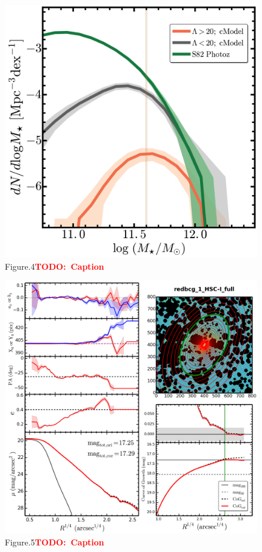 \documentclass[preprint]{aastex}
\newcommand{\todo}[1]{\textcolor{red}{\textbf{TODO:~#1}}}
\begin{document}
\begin{CJK*}{UTF8}{gbsn}
\clearpage
{}
\begin{figure}
    \centering 
    \includegraphics[width=14.5cm]{fig/dr1_redbcg_isedfit_mass_fsps1_sbpsum_imgsub_use_logm_distribution_s82}
    \caption{Figure.4\todo{Caption}}\label{figure:4}
\end{figure}

\clearpage
{}
\begin{figure}
    \centering 
    \includegraphics[width=15.5cm]{fig/redbcg_1_HSC-I_full_imgsub_ellip_default_sum.png}
    \caption{Figure.5\todo{Caption}}\label{figure:5}
\end{figure}


\end{CJK*}
\end{document}
